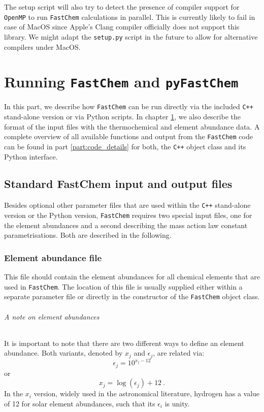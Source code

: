 \documentclass[numbers=noenddot]{aux/fcmanual}
\newcommand{\fc}{\texttt{FastChem}\xspace}
\newcommand{\pfc}{\texttt{pyFastChem}\xspace}
\newcommand{\cpp}{\ttt{C++}\xspace}
\newcommand{\ttt}[1]{\texttt {#1}}
\begin{document}
The setup script will also try to detect the presence of compiler support for \texttt{OpenMP} to run \fc calculations in parallel. This is currently likely to fail in case of MacOS since Apple's Clang compiler officially does not support this library. We might adapt the \verb|setup.py| script in the future to allow for alternative compilers under MacOS.



\part{Running \fc and \pfc}
\label{part:running}

In this part, we describe how \fc can be run directly via the included \cpp stand-alone version or via Python scripts. In chapter \ref{sec:fastchem_input_files}, we also describe the format of the input files with the thermochemical and element abundance data. A complete overview of all available functions and output from the \fc code can be found in part \ref{part:code_details} for both, the \cpp object class and its Python interface.

\chapter{Standard FastChem input and output files}
\label{sec:fastchem_input_files}

Besides optional other parameter files that are used within the \cpp stand-alone version or the Python version, \fc requires two special input files, one for the element abundances and a second describing the mass action law constant parametrisations. Both are described in the following.

\section{Element abundance file}

This file should contain the element abundances for all chemical elements that are used in \fc. The location of this file is usually supplied either within a separate parameter file or directly in the constructor of the \fc object class.

\paragraph{A note on element abundances}
It is important to note that there are two different ways to define an element abundance. Both variants, denoted by $x_j$ and $\epsilon_j$, are related via:
\begin{equation}
\epsilon_j = 10^{x_j - 12}
\end{equation}
or
\begin{equation}
 x_j = \log\left(\epsilon_j\right) + 12 \ .
\end{equation}
In the $x_i$ version, widely used in the astronomical literature, hydrogen has a value of 12 for solar element abundances, such that its $\epsilon_i$ is unity. 
\end{document}
